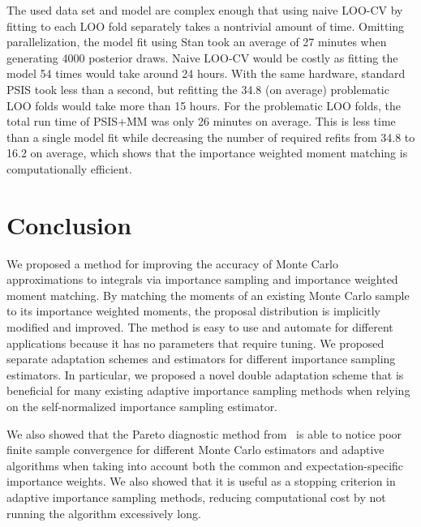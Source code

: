 \documentclass[12pt]{article}
\begin{document}
The used data set and model are complex enough that using naive LOO-CV
by fitting to each LOO fold separately takes
a nontrivial amount of time. Omitting parallelization, the model
fit using Stan took an average of 27 minutes when generating
4000 posterior draws. Naive LOO-CV would be costly as fitting the model 54 times would take around 24 hours.
With the same hardware, standard PSIS took less than a second, but refitting the 34.8 (on average)
problematic LOO folds would take more than 15 hours.
For the problematic LOO folds, the total run time of PSIS+MM was only 26 minutes on average.
This is less time than a single model fit
while decreasing the number of required refits from 34.8 to 16.2 on average, which shows that
the importance weighted moment matching
is computationally efficient.
















\section{Conclusion}

We proposed a method for improving the accuracy
of Monte Carlo approximations to integrals via importance sampling and importance weighted moment matching.
By matching the moments of an existing Monte Carlo sample to
its importance weighted moments, the proposal
distribution is implicitly modified and improved.
%
%
%
%
The method is easy to use and automate for different applications because it has
no parameters that require tuning.
We proposed separate adaptation schemes and estimators for different importance sampling estimators.
In particular, we proposed a novel double adaptation scheme that is beneficial for many existing
adaptive importance sampling methods when relying on the self-normalized importance sampling estimator.




We also showed that the Pareto diagnostic method from~\citet{vehtari2015pareto}
is able to notice poor finite sample convergence for different Monte Carlo estimators
and adaptive algorithms
when taking into account both the common and expectation-specific importance weights.
We also showed that it is useful as a stopping criterion
in adaptive importance sampling methods, reducing computational cost by not running
the algorithm excessively long.
\end{document}
